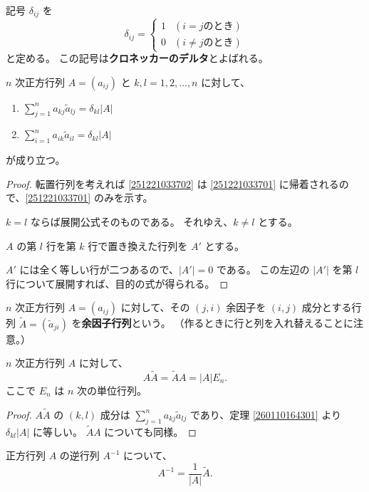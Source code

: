 \begin{dfn}[クロネッカーのデルタ]
  記号 \(\delta_{ij}\) を
  \begin{equation*}
    \delta_{ij}=
    \begin{cases}
      1 & (i=j \text{のとき})     \\
      0 & (i\neq j \text{のとき})
    \end{cases}
  \end{equation*}
  と定める。
  この記号は\textbf{クロネッカーのデルタ}とよばれる。
\end{dfn}

\begin{thm}\label{260110164301}
  \(n\) 次正方行列 \(A=(a_{ij})\) と \(k,l=1,2,\ldots,n\) に対して、
  \begin{enumerate}
    \item\label{251221033701} \(\displaystyle \sum_{j=1}^n a_{kj}\tilde{a}_{lj}=\delta_{kl}|A|\)
    \item\label{251221033702} \(\displaystyle \sum_{i=1}^n a_{ik}\tilde{a}_{il}=\delta_{kl}|A|\)
  \end{enumerate}
  が成り立つ。
\end{thm}

\begin{proof}
  転置行列を考えれば \ref{251221033702} は \ref{251221033701} に帰着されるので、\ref{251221033701} のみを示す。

  \(k=l\) ならば展開公式そのものである。
  それゆえ、\(k\neq l\) とする。

  \(A\) の第 \(l\) 行を第 \(k\) 行で置き換えた行列を \(A'\) とする。

  \(A'\) には全く等しい行が二つあるので、\(|A'|=0\) である。
  この左辺の \(|A'|\) を第 \(l\) 行について展開すれば、目的の式が得られる。
\end{proof}

\begin{dfn}[余因子行列]
  \(n\) 次正方行列 \(A=(a_{ij})\) に対して、その \((j,i)\) 余因子を \((i,j)\) 成分とする行列 \(\widetilde{A}=(\tilde{a}_{ji})\) を\textbf{余因子行列}という。
  （作るときに行と列を入れ替えることに注意。）
\end{dfn}

\begin{thm}
  \(n\) 次正方行列 \(A\) に対して、
  \[A\widetilde{A}=\widetilde{A}A=|A|E_n.\]
  ここで \(E_n\) は \(n\) 次の単位行列。
\end{thm}

\begin{proof}
  \(A\widetilde{A}\) の \((k,l)\) 成分は \(\displaystyle \sum_{j=1}^n a_{kj}\tilde{a}_{lj}\) であり、定理 \ref{260110164301} より \(\delta_{kl}|A|\) に等しい。
  \(\widetilde{A}A\) についても同様。
\end{proof}

\begin{col*}
  正方行列 \(A\) の逆行列 \(A^{-1}\) について、
  \[A^{-1}=\frac{1}{|A|}\widetilde{A}.\]
\end{col*}
